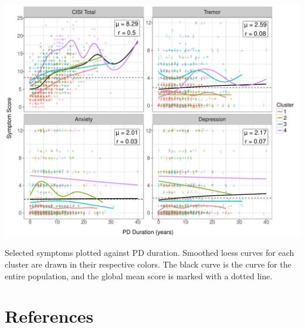\documentclass[preprint,5p]{elsarticle} %
\begin{document}
\begin{suppfigure*}[p]
  \centering
  \includegraphics[width=0.8\linewidth]{long4-d.pdf}
  \caption{Selected symptoms plotted against PD duration. Smoothed loess curves for each cluster
  are drawn in their respective colors. The black curve is the curve for the entire population, and
the global mean score is marked with a dotted line.}
  \label{fig:long4}
\end{suppfigure*}


\section{References}


\end{document}
